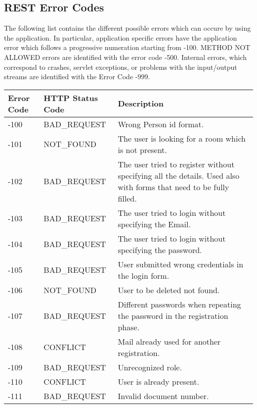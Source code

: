 \subsection{REST Error Codes}

The following list contains the different possible errors which can occure by using the application. In particular, application specific errors have the application error which follows a progressive numeration starting from -100. 
METHOD NOT ALLOWED errors are identified with the error code -500.
Internal errors, which correspond to crashes, servlet exceptions, or problems with the input/output streams are identified with the Error Code -999.

\begin{longtable}{|p{}|p{} |p{}|} 
\hline
\textbf{Error Code} & \textbf{HTTP Status Code} & \textbf{Description} \\\hline
-100 & BAD\_REQUEST            & Wrong Person id format. \\ \hline
-101 & NOT\_FOUND              & The user is looking for a room which is not present. \\ \hline
-102 & BAD\_REQUEST            & The user tried to register without specifying all the details. Used also with forms that need to be fully filled. \\ \hline
-103 & BAD\_REQUEST            & The user tried to login without specifying the Email. \\ \hline
-104 & BAD\_REQUEST            & The user tried to login without specifying the password. \\ \hline
-105 & BAD\_REQUEST            & User submitted wrong credentials in the login form. \\ \hline
-106 & NOT\_FOUND              & User to be deleted not found. \\ \hline
-107 & BAD\_REQUEST            & Different passwords when repeating the password in the registration phase. \\ \hline
-108 & CONFLICT                & Mail already used for another registration. \\ \hline
-109 & BAD\_REQUEST            & Unrecognized role. \\ \hline
-110 & CONFLICT                & User is already present. \\ \hline
-111 & BAD\_REQUEST            & Invalid document number. \\ \hline

\end{longtable}
